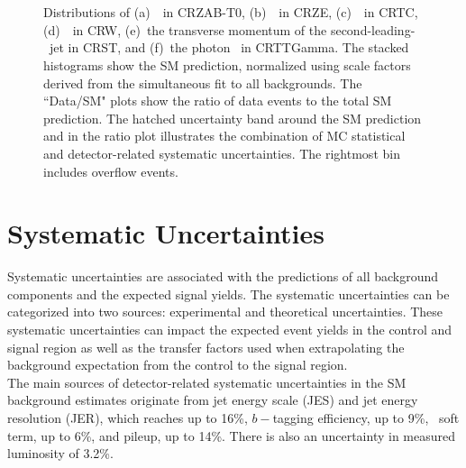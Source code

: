 \begin{figure}[htpb]
  \begin{center}
    \\
    \\

    \caption[Distribution of kinematic variables in CRZ, CRTC, CRW, CRST, and CRTTGamma.]{Distributions of (a)~\mttwoprime\ in CRZAB-T0, (b)~\metprime\ in CRZE, (c)~\rISR\ in CRTC, 
      (d)~\mtbmax\ in CRW, (e)~the transverse momentum of the second-leading-\pT\ jet in CRST,  and
      (f)~the photon \pT\ in CRTTGamma. The stacked histograms show the SM prediction, normalized using scale factors derived from the simultaneous fit to all backgrounds. The ``Data/SM" plots show the ratio of data events to the total SM prediction. The hatched uncertainty band around the SM prediction and in the ratio plot illustrates the combination of MC statistical and detector-related systematic uncertainties. The rightmost bin includes overflow events.}
    \label{fig:CRs}
  \end{center}
\end{figure}


\section{Systematic Uncertainties}
\label{sec:Systematics}

Systematic uncertainties are associated with the predictions of all background components and the expected signal yields. The systematic uncertainties can be categorized into two sources: experimental and theoretical uncertainties. These systematic uncertainties can impact the expected event yields in the control and signal region as well as the transfer factors used when extrapolating the background expectation from the control to the signal region. \\

The main sources of detector-related systematic uncertainties in the SM background estimates originate from jet energy scale (JES) and jet energy resolution (JER), which reaches up to 16\%, $b-$tagging efficiency, up to 9\%, \met\ soft term, up to 6\%, and pileup, up to 14\%.  There is also an uncertainty in measured luminosity of 3.2\%.

